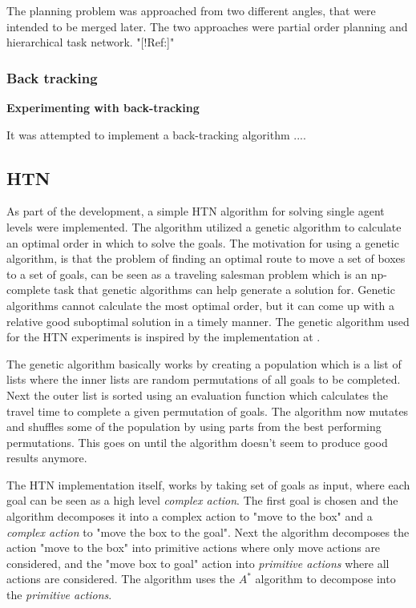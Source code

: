 \documentclass[Main]{subfiles}
\begin{document}
\FloatBarrier

The planning problem was approached from two different angles, that were intended to be merged later. The two approaches were partial order planning and hierarchical task network. "[!Ref:]" 


\subsubsection{Back tracking}

\textbf{Experimenting with back-tracking}

It was attempted to implement a back-tracking algorithm ....






\subsection{HTN}
As part of the development, a simple HTN algorithm for solving single agent levels were implemented.
The algorithm utilized a genetic algorithm to calculate an optimal order in which to solve the goals.
The motivation for using a genetic algorithm, is that the problem of finding an optimal route to move a set of boxes to a set of goals, can be seen as a traveling salesman problem which is an np-complete task that genetic algorithms can help generate a solution for.
Genetic algorithms cannot calculate the most optimal order, but it can come up with a relative good suboptimal solution in a timely manner. The genetic algorithm used for the HTN experiments is inspired by the implementation at \cite{genetic}.

The genetic algorithm basically works by creating a population which is a list of lists where the inner lists are random permutations of all goals to be completed.
Next the outer list is sorted using an evaluation function which calculates the travel time to complete a given permutation of goals.
The algorithm now mutates and shuffles some of the population by using parts from the best performing permutations.
This goes on until the algorithm doesn't seem to produce good results anymore.

The HTN implementation itself, works by taking set of goals as input, where each goal can be seen as a high level \textit{complex action}. The first goal is chosen and the algorithm decomposes it into a complex action to "move to the box" and a \textit{complex action} to "move the box to the goal". Next the algorithm decomposes the action "move to the box" into primitive actions where only move actions are considered, and the "move box to goal" action into \textit{primitive actions} where all actions are considered.
The algorithm uses the $A^*$ algorithm to decompose into the \textit{primitive actions}.
\end{document}
